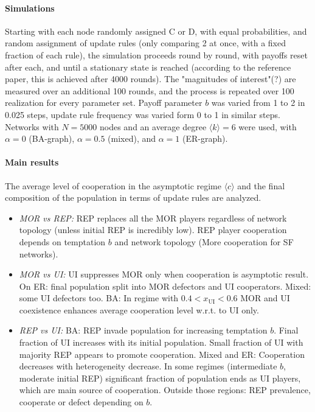 \paragraph{Simulations}
Starting with each node randomly assigned C or D, with equal probabilities, and random assignment of update rules (only comparing 2 at once, with a fixed fraction of each rule), the simulation proceeds round by round, with payoffs reset after each, and until a stationary state is reached (according to the reference paper, this is achieved after 4000 rounds). The "magnitudes of interest"(?) are measured over an additional 100 rounds, and the process is repeated over 100 realization for every parameter set. Payoff parameter $b$ was varied from 1 to 2 in 0.025 steps, update rule frequency was varied form 0 to 1 in similar steps. Networks with $N=5000$ nodes and an average degree $\langle k \rangle = 6$ were used, with  $\alpha=0$ (BA-graph), $\alpha=0.5$ (mixed), and $\alpha = 1$ (ER-graph).

\paragraph{Main results}
The average level of cooperation in the asymptotic regime $\langle c \rangle$ and the final composition of the population in terms of update rules are analyzed.
\begin{itemize}
	\item \emph{MOR vs REP:} REP replaces all the MOR players regardless of network topology (unless initial REP is incredibly low). REP player cooperation depends on temptation $b$ and network topology (More cooperation for SF networks).
	\item \emph{MOR vs UI:} UI suppresses MOR only when cooperation is asymptotic result. On ER: final population split into MOR defectors and UI cooperators. Mixed: some UI defectors too. BA: In regime with $0.4 < x_\mathrm{UI} < 0.6$ MOR and UI coexistence enhances average cooperation level w.r.t. to UI only. 
	\item \emph{REP vs UI:} BA: REP invade population for increasing temptation $b$. Final fraction of UI increases with its initial population. Small fraction of UI with majority REP appears to promote cooperation. Mixed and ER: Cooperation decreases with heterogeneity decrease. In some regimes (intermediate $b$, moderate initial REP) significant fraction of population ends as UI players, which are main source of cooperation. Outside those regions: REP prevalence, cooperate or defect depending on $b$.
\end{itemize}
%
